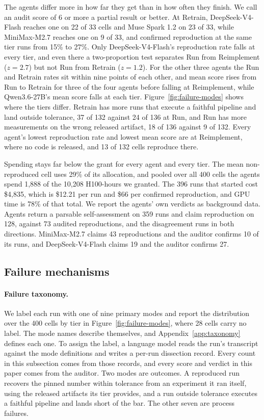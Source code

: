 \documentclass{article} %
\begin{document}
The agents differ more in how far they get than in how often they finish. We
call an audit score of 6 or more a partial result or better. At Retrain,
DeepSeek-V4-Flash reaches one on 22 of 33 cells and Muse Spark 1.2 on 23 of 33, while
MiniMax-M2.7 reaches one on 9 of 33, and confirmed reproduction at the same
tier runs from 15\% to 27\%. Only DeepSeek-V4-Flash's reproduction rate falls at
every tier, and even there a two-proportion test separates Run from
Reimplement ($z = 2.7$) but not Run from Retrain ($z = 1.2$). For the other
three agents the Run and Retrain rates sit within nine points of each other, and mean score rises from Run to Retrain for three
of the four agents before falling at Reimplement, while Qwen3.6-27B's mean score falls at
each tier. Figure~\ref{fig:failure-modes}
shows where the tiers differ. Retrain has more runs that execute a faithful pipeline
and land outside tolerance, 37 of 132 against 24 of 136 at Run, and Run has
more measurements on the wrong released artifact, 18 of 136 against 9 of 132.
Every agent's lowest reproduction rate and lowest mean score are at
Reimplement, where no code is released, and 13 of 132 cells reproduce there.

Spending stays far below the grant for every agent and every tier. The mean
non-reproduced cell uses 29\% of its allocation, and pooled over all 400 cells
the agents spend 1{,}888 of the 10{,}208 H100-hours we granted. The 396 runs that started cost \$4{,}835, which is
\$12.21 per run and \$66 per confirmed reproduction, and GPU time is 78\% of
that total. We report the agents' own verdicts as background data. Agents
return a parsable self-assessment on 359 runs and claim reproduction on 128,
against 73 audited reproductions, and the disagreement runs in both
directions. MiniMax-M2.7 claims 43 reproductions and the auditor confirms 10
of its runs, and DeepSeek-V4-Flash claims 19 and the auditor confirms 27.

\subsection{Failure mechanisms}
\label{subsec:mechanisms}

\paragraph{Failure taxonomy.}
We label each run with one of nine primary modes and report the
distribution over the 400 cells by tier in Figure~\ref{fig:failure-modes}, where
28 cells carry no label. The mode names describe
themselves, and Appendix~\ref{app:taxonomy} defines each one. To assign the label, a language model reads the run's
transcript against the mode definitions and writes a per-run dissection
record. Every count in this subsection comes from those records, and every
score and verdict in this paper comes from the auditor. Two modes are outcomes. A
reproduced run recovers the pinned number within tolerance from an experiment
it ran itself, using the released artifacts its tier provides, and a run outside tolerance executes a faithful pipeline
and lands short of the bar. The other seven are process failures.
\end{document}
